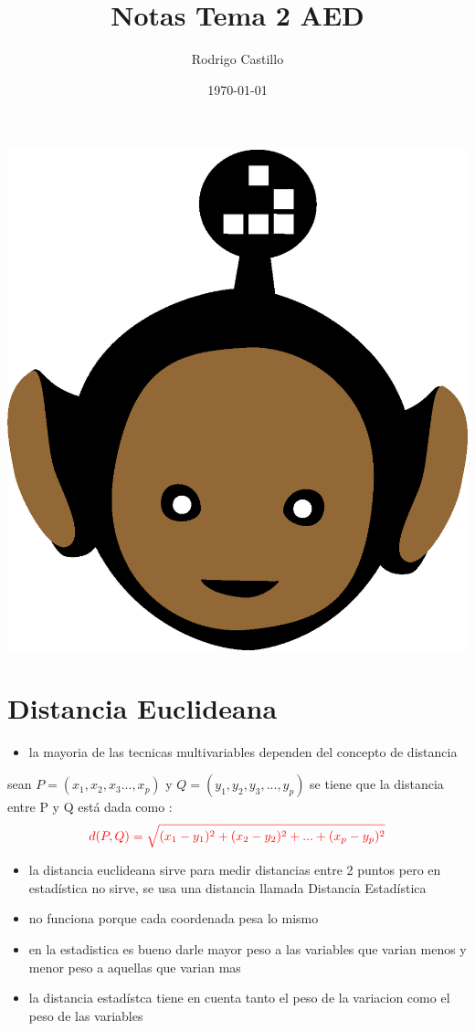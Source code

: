 \documentclass[10pt,a4paper]{article} %
\begin{document}
    \title{{  Notas Tema 2 AED  }}
    \author{{Rodrigo Castillo}}
    \date{\today}

    \maketitle


    \includegraphics[width=0.1\linewidth]{negro_cara.png}
    \section{Distancia Euclideana}
        \begin{itemize}
            \item {la mayoria de las tecnicas multivariables dependen del
                concepto de distancia}
        \end{itemize}
        sean $ P = (x_1 , x_2 , x_3 ... , x_p)  $ y $ Q = (y_1 , y_2 , y_3 , ... , y_p)  $ se tiene que la distancia entre P y Q está dada como  :
        \begin{equation}
            \color{red} d(P,Q) = \sqrt{(x_1 - y_1) ^{2} + (x_2 - y_2)^{2} + ...
            + (x_p - y_p) ^{2}   }  \color{white}
        \end{equation}
        \begin{itemize}
            \item {la distancia euclideana sirve para medir distancias entre 2
                puntos pero en estadística no sirve, se usa una distancia
            llamada Distancia Estadística}
            \item {no funciona porque cada coordenada pesa lo mismo }
            \item {en la estadistica es bueno darle mayor peso a las variables
                que varian menos y menor peso a aquellas que varian mas}
            \item {la distancia estadístca tiene en cuenta tanto el peso de la variacion como el peso de las variables}
        \end{itemize}
\end{document}
